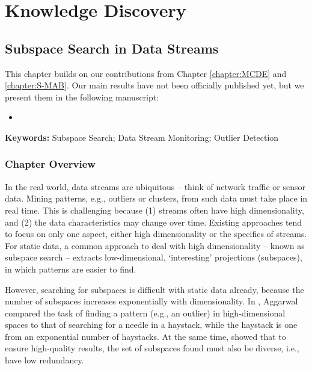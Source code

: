 \part{Knowledge Discovery}
\label{partIV}

\chapter{Subspace Search in Data Streams}
\glsresetall
\label{chapter:subspacesearch}

This chapter builds on our contributions from Chapter \ref{chapter:MCDE} and \ref{chapter:S-MAB}. Our main results have not been officially published yet, but we present them in the following manuscript:
\begin{itemize}[noitemsep]
	\item {}
\end{itemize}
\textbf{Keywords:} Subspace Search; Data Stream Monitoring; Outlier Detection

\section{Chapter Overview}

In the real world, data streams are ubiquitous -- think of network traffic or sensor data. Mining patterns, e.g., outliers or clusters, from such data must take place in real time. This is challenging because (1) streams often have high dimensionality, and (2) the data characteristics may change over time. 
Existing approaches tend to focus on only one aspect, either high dimensionality or the specifics of streams. For static data, a common approach to deal with high dimensionality -- known as subspace search -- extracts low-dimensional, `interesting' projections (subspaces), in which patterns are easier to find.

However, searching for subspaces is difficult with static data already, because the number of subspaces increases exponentially with dimensionality. In \cite{DBLP:books/sp/Aggarwal2013}, Aggarwal compared the task of finding a pattern (e.g., an outlier) in high-dimensional spaces to that of searching for a needle in a haystack, while the haystack is one from an exponential number of haystacks. At the same time, \cite{DBLP:journals/ijdsa/TrittenbachB19} showed that to ensure high-quality results, the set of subspaces found must also be diverse, i.e., have low redundancy.

